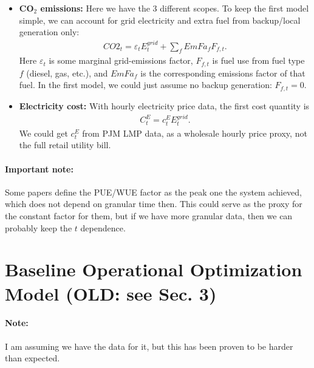 \documentclass{article}
\begin{document}
\begin{itemize}
    \item \textbf{CO$_2$ emissions:} Here we have the 3 different scopes. To keep the first model simple, we can account  for grid electricity and extra fuel from backup/local generation only:
    \begin{align*}
        CO2_t=\varepsilon_tE_t^{grid}+\sum_f EmFa_f F_{f,t}.
    \end{align*}
    Here $\varepsilon_t$ is some marginal grid-emissions factor, $F_{f,t}$ is fuel use from fuel type $f$ (diesel, gas, etc.), and $EmFa_f$ is the corresponding emissions factor of that fuel. In the first model, we could just assume no backup generation:  $F_{f,t}=0$.   %

    \item \textbf{Electricity cost:} With hourly electricity price data, the first cost quantity is
    \begin{align*}
        C_t^E=c_t^E E_t^{grid}.
    \end{align*}
    We could get $c_t^E$ from PJM LMP data, as a wholesale hourly price proxy, not the full retail utility bill. 
\end{itemize}


\paragraph{Important note:} Some papers define the PUE/WUE factor as the peak one the system achieved, which does not depend on granular time then. This could serve as the proxy for the constant factor for them, but if we have more granular data, then we can probably keep the $t$ dependence.


\section{Baseline Operational Optimization Model (OLD: see Sec. 3)}

\paragraph{Note:} I am assuming we have the data for it, but this has been proven to be harder than expected.
\end{document}
